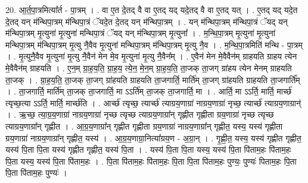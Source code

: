 \documentclass[17pt]{extarticle}
\begin{document}
20. आ॒र्त॒पा॒त्रमित्या᳚र्त - पा॒त्रम् । . वा ए॒त दे॒तद् वै वा ए॒तद् यद् यदे॒तद् वै वा ए॒तद् यत् । . ए॒तद् यद् यदे॒त दे॒तद् यन् म॑न्थिपा॒त्रम् म॑न्थिपा॒त्रं ॅयदे॒त दे॒तद् यन् म॑न्थिपा॒त्रम् । . यन् म॑न्थिपा॒त्रम् म॑न्थिपा॒त्रं ॅयद् यन् म॑न्थिपा॒त्रम् मृ॒त्युना॑ मृ॒त्युना॑ मन्थिपा॒त्रं ॅयद् यन् म॑न्थिपा॒त्रम् मृ॒त्युना᳚ । . म॒न्थि॒पा॒त्रम् मृ॒त्युना॑ मृ॒त्युना॑ मन्थिपा॒त्रम् म॑न्थिपा॒त्रम् मृ॒त्यु नै॒वैव मृ॒त्युना॑ मन्थिपा॒त्रम् म॑न्थिपा॒त्रम् मृ॒त्यु नै॒व । . म॒न्थि॒पा॒त्रमिति॑ मन्थि - पा॒त्रम् । . मृ॒त्युनै॒वैव मृ॒त्युना॑ मृ॒त्यु नै॒वैन॑ मेन मे॒व मृ॒त्युना॑ मृ॒त्यु नै॒वैन᳚म् । . ए॒वैन॑ मेन मे॒वैवैन॑म् ग्राहयति ग्राहय त्येन मे॒वैवैन॑म् ग्राहयति । . ए॒न॒म् ग्रा॒ह॒य॒ति॒ ग्रा॒ह॒य॒ त्ये॒न॒ मे॒न॒म् ग्रा॒ह॒य॒ति॒ ता॒जक् ता॒जग् ग्रा॑हय त्येन मेनम् ग्राहयति ता॒जक् । . ग्रा॒ह॒य॒ति॒ ता॒जक् ता॒जग् ग्रा॑हयति ग्राहयति ता॒जगार्ति॒ मार्ति॑म् ता॒जग् ग्रा॑हयति ग्राहयति ता॒जगार्ति᳚म् । . ता॒जगार्ति॒ मार्ति॑म् ता॒जक् ता॒जगार्ति॒ मा ऽऽर्ति॑म् ता॒जक् ता॒जगार्ति॒ मा । . आर्ति॒ मा ऽऽर्ति॒ मार्ति॒ मार्च्छ॑ त्यृच्छ॒त्या ऽऽर्ति॒ मार्ति॒ मार्च्छ॑ति । . आर्च्छ॑ त्यृच्छ॒ त्यार्च्छ॑ त्याग्रय॒णाग्रा॑ नाग्रय॒णाग्रा॑ नृच्छ॒ त्यार्च्छ॑ त्याग्रय॒णाग्रान्॑ । . ऋ॒च्छ॒ त्या॒ग्र॒य॒णाग्रा॑ नाग्रय॒णाग्रा॑ नृच्छ त्यृच्छ त्याग्रय॒णाग्रा᳚न् गृह्णीत गृह्णीता ग्रय॒णाग्रा॑ नृच्छ त्यृच्छ त्याग्रय॒णाग्रा᳚न् गृह्णीत । . आ॒ग्र॒य॒णाग्रा᳚न् गृह्णीत गृह्णीता ग्रय॒णाग्रा॑ नाग्रय॒णाग्रा᳚न् गृह्णीत॒ यस्य॒ यस्य॑ गृह्णीता ग्रय॒णाग्रा॑ नाग्रय॒णाग्रा᳚न् गृह्णीत॒ यस्य॑ । . आ॒ग्र॒य॒णाग्रा॒नित्या᳚ग्रय॒ण - अ॒ग्रा॒न् । . गृ॒ह्णी॒त॒ यस्य॒ यस्य॑ गृह्णीत गृह्णीत॒ यस्य॑ पि॒ता पि॒ता यस्य॑ गृह्णीत गृह्णीत॒ यस्य॑ पि॒ता । . यस्य॑ पि॒ता पि॒ता यस्य॒ यस्य॑ पि॒ता पि॑ताम॒हः पि॑ताम॒हः पि॒ता यस्य॒ यस्य॑ पि॒ता पि॑ताम॒हः । . पि॒ता पि॑ताम॒हः पि॑ताम॒हः पि॒ता पि॒ता पि॑ताम॒हः पुण्यः॒ पुण्यः॑ पिताम॒हः पि॒ता पि॒ता पि॑ताम॒हः पुण्यः॑ । \newline
\end{document}
